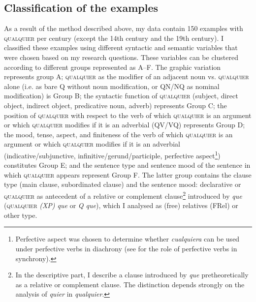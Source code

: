 \newpage
\subsection{{Classification} {of} {the} {examples}} \label{sec:5.1.2}
\largerpage[2]
As a result of the method described above, my data contain 150 examples with \textsc{qualquier} per century (except the 14{th} century and the 19{th} century). I classified these examples using different syntactic and semantic variables that were chosen based on my research questions. These variables can be clustered according to different groups represented as A–F. The graphic variation represents group A; \textsc{qualquier} as the modifier of an adjacent noun vs. \textsc{qualquier} alone (i.e. as bare Q without noun modification, or QN/NQ as nominal modification) is Group B; the syntactic function of \textsc{qualquier} (subject, direct object, indirect object, predicative noun, adverb) represents Group C; the position of \textsc{qualquier} with respect to the verb of which \textsc{qualquier} is an argument or which \textsc{qualquier} modifies if it is an adverbial (QV/VQ) represents Group D; the mood, tense, aspect, and finiteness of the verb of which \textsc{qualquier} is an argument or which \textsc{qualquier} modifies if it is an adverbial (indicative/subjunctive, infinitive/gerund/participle, perfective aspect\footnote{{Perfective aspect was chosen to determine whether} {\textit{cualquiera}} {can be used under perfective verbs in diachrony (see  for the role of perfective verbs in synchrony).}}) constitutes Group E; and the sentence type and sentence mood of the sentence in which \textsc{qualquier} appears represent Group F. The latter group contains the clause type (main clause, subordinated clause) and the sentence mood: declarative or \textsc{qualquier} as antecedent of a relative or complement clause\footnote{{In the descriptive part, I describe a clause introduced by} {\textit{que}} {pretheoretically as a relative or complement clause. The distinction depends strongly on the analysis of} {\textit{quier}} {in} {\textit{qualquier}}.} introduced by \textit{que} (\textsc{qualquier} \textit{(XP) que} or \textit{Q que}), which I analysed as (free) relatives (FRel) or other type.

